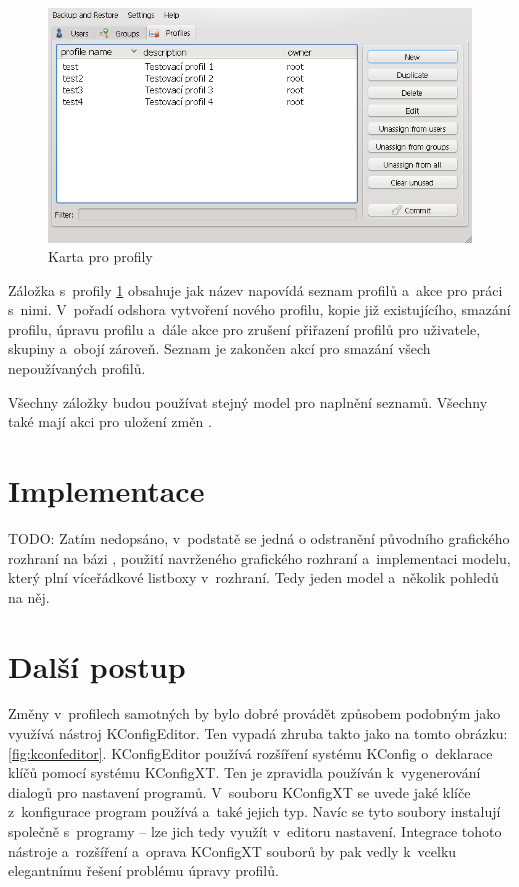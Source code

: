 \begin{figure}[h]
    \centering
    \includegraphics[width=13cm]{obrazky/navrh-profiles-fixd.png}
    \caption{Karta pro profily}
    \label{fig:kt4_newprofiles}
\end{figure}

Záložka s~profily \ref{fig:kt4_newprofiles} obsahuje jak název napovídá seznam profilů a~akce pro práci s~nimi. V~pořadí odshora vytvoření nového profilu, kopie již existujícího, smazání profilu, úpravu profilu a~dále akce pro zrušení přiřazení profilů pro uživatele, skupiny a~obojí zároveň. Seznam je zakončen akcí pro smazání všech nepoužívaných profilů.

Všechny záložky budou používat stejný model pro naplnění seznamů. Všechny také mají akci pro uložení změn .

\section{Implementace}
TODO: Zatím nedopsáno, v~podstatě se jedná o odstranění původního grafického rozhraní na bázi , použití navrženého grafického rozhraní a~implementaci modelu, který plní víceřádkové listboxy v~rozhraní. Tedy jeden model a~několik pohledů na něj.

\section{Další postup}
Změny v~profilech samotných by bylo dobré provádět způsobem podobným jako využívá nástroj KConfigEditor. Ten vypadá zhruba takto jako na tomto obrázku: \ref{fig:kconfeditor}. KConfigEditor používá rozšíření systému KConfig o~deklarace klíčů pomocí systému KConfigXT. Ten je zpravidla používán k~vygenerování dialogů pro nastavení programů. V~souboru KConfigXT se uvede jaké klíče z~konfigurace program používá a~také jejich typ. Navíc se tyto soubory instalují společně s~programy -- lze jich tedy využít v~editoru nastavení. Integrace tohoto nástroje a~rozšíření a~oprava KConfigXT souborů by pak vedly k~vcelku elegantnímu řešení problému úpravy profilů.

